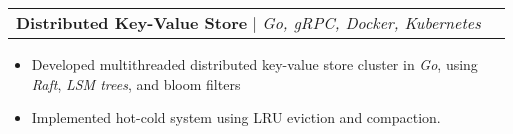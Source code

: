 \documentclass[letterpaper,11pt]{article}
\makeatletter
\newcommand{\resumeItem}[1]{
  \item\small{
    {#1 \vspace{-2pt}}
  }
}
\newcommand{\resumeProjectHeading}[2]{
    \item
    \begin{tabular*}{0.97\textwidth}{l@{\extracolsep{\fill}}r}
      \small#1 & #2 \\
    \end{tabular*}\vspace{-7pt}
}
\newcommand{\resumeItemListStart}{\begin{itemize}}
\newcommand{\resumeItemListEnd}{\end{itemize}\vspace{-5pt}}
\makeatother
\begin{document}

        \resumeProjectHeading
          {\textbf{Distributed Key-Value Store} $|$ \emph{Go, gRPC, Docker, Kubernetes}}{}
          \resumeItemListStart
            \resumeItem{Developed multithreaded distributed key-value store cluster in \textit{Go}, using \textit{Raft}, \textit{LSM trees}, and bloom filters}
            \resumeItem{Implemented hot-cold system using LRU eviction and compaction. }
          \resumeItemListEnd



\end{document}
